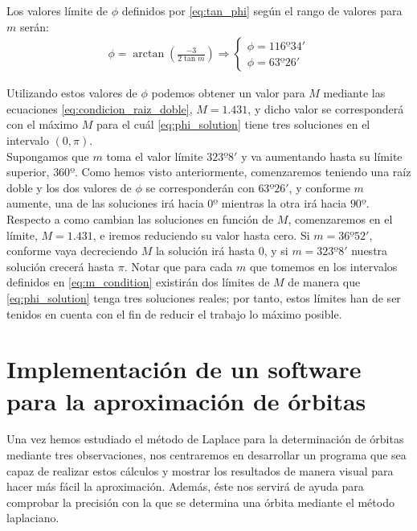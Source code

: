 \documentclass[11pt]{book}
\newcommand\ddfrac[2]{\frac{\displaystyle #1}{\displaystyle #2}}
\newcommand{\markedchapter}[2]{\chapter[#2]{#2%
\chaptermark{#1}}
\chaptermark{#1}}
\begin{document}
Los valores límite de $\phi$ definidos por \eqref{eq:tan_phi} según el rango de valores para $m$ serán:
\begin{align}
\phi=\arctan{(\ddfrac{-3}{2\tan{m}})} \Longrightarrow
\left\{
\begin{array}{l}
	\phi=116º34'\\
	\phi=63º26'
\end{array}
\right.
\end{align}

Utilizando estos valores de $\phi$ podemos obtener un valor para $M$ mediante las ecuaciones \eqref{eq:condicion_raiz_doble}, $M=1.431$, y dicho valor se corresponderá con el máximo $M$ para el cuál \eqref{eq:phi_solution} tiene tres soluciones en el intervalo $(0,\pi)$.\\

Supongamos que $m$ toma el valor límite $323º8'$ y va aumentando hasta su límite superior, $360º$. Como hemos visto anteriormente, comenzaremos teniendo una raíz doble y los dos valores de $\phi$ se corresponderán con $63º26'$, y conforme $m$ aumente, una de las soluciones irá hacia $0º$ mientras la otra irá hacia $90º$. Respecto a como cambian las soluciones en función de $M$, comenzaremos en el límite, $M=1.431$, e iremos reduciendo su valor hasta cero. Si $m=36º52'$, conforme vaya decreciendo $M$ la solución irá hasta $0$, y si $m=323º8'$ nuestra solución crecerá hasta $\pi$. Notar que para cada $m$ que tomemos en los intervalos definidos en \eqref{eq:m_condition} existirán dos límites de $M$ de manera que \eqref{eq:phi_solution} tenga tres soluciones reales; por tanto, estos límites han de ser tenidos en cuenta con el fin de reducir el trabajo lo máximo posible.\\
















\markedchapter{Implementación}{Implementación de un software para la aproximación de órbitas}
\label{chap:implementation}
Una vez hemos estudiado el método de Laplace para la determinación de órbitas mediante tres observaciones, nos centraremos en desarrollar un programa que sea capaz de realizar estos cálculos y mostrar los resultados de manera visual para hacer más fácil la aproximación. Además, éste nos servirá de ayuda para comprobar la precisión con la que se determina una órbita mediante el método laplaciano.\\
\end{document}
